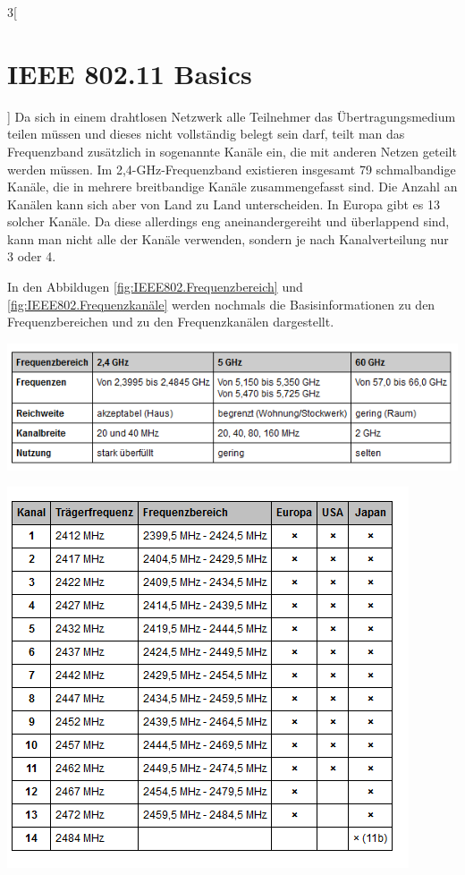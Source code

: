 \begin{multicols}{3}[\section{IEEE 802.11 Basics}]
Da sich in einem drahtlosen Netzwerk alle Teilnehmer das Übertragungsmedium teilen müssen und dieses nicht vollständig belegt sein darf, teilt man das Frequenzband zusätzlich in sogenannte Kanäle ein, die mit anderen Netzen geteilt werden müssen. Im 2,4-GHz-Frequenzband existieren insgesamt 79 schmalbandige Kanäle, die in mehrere breitbandige Kanäle zusammengefasst sind. Die Anzahl an Kanälen kann sich aber von Land zu Land unterscheiden. In Europa gibt es 13 solcher Kanäle. Da diese allerdings eng aneinandergereiht und überlappend sind, kann man nicht alle der Kanäle verwenden, sondern je nach Kanalverteilung nur 3 oder 4. ~\cite{basics.4}

In den Abbildugen \ref{fig:IEEE802.Frequenzbereich} und \ref{fig:IEEE802.Frequenzkanäle} werden nochmals die Basisinformationen zu den Frequenzbereichen und zu den Frequenzkanälen dargestellt.

\begin{Figure}
\includegraphics[width=\linewidth]{Kapitel/IEEE802.11/Grafiken/Frequenzbereiche_80211X.png}
\label{fig:IEEE802.Frequenzbereich}
\end{Figure}

\begin{Figure}
\includegraphics[width=\linewidth]{Kapitel/IEEE802.11/Grafiken/Traegerfrequenz.png}
\label{fig:IEEE802.Frequenzkanäle}
\end{Figure}


\end{multicols}
